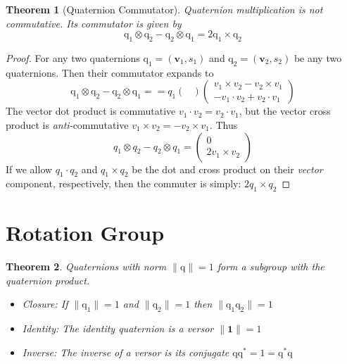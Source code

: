 \documentclass{amsart}
\newtheorem{theorem}{Theorem}[section]
\theoremstyle{definition}
\theoremstyle{remark}
\numberwithin{equation}{section}
\begin{document}
\begin{theorem}[Quaternion Commutator]
  Quaternion multiplication is not commutative. Its commutator is given by
  \begin{equation}
    \mathrm{q}_1\otimes\mathrm{q}_2 - \mathrm{q}_2 \otimes \mathrm{q}_1 = 2 \mathrm{q}_1 \times \mathrm{q}_2 \label{eqn:commutator}
  \end{equation}
\end{theorem}
\begin{proof}
  For any two quaternions $\mathrm{q}_1=(\mathbf{v}_1, s_1)$ and $\mathrm{q}_2=(\mathbf{v}_2, s_2)$ be any two quaternions. Then their commutator expands to
  \begin{equation}
		\mathrm{q}_1 \otimes \mathrm{q}_2 - \mathrm{q}_2 \otimes \mathrm{q}_1 =
    =
		q_1
		\begin{pmatrix}
		\end{pmatrix}
    \begin{pmatrix}
      v_1 \times v_2 - v_2 \times v_1 \\
      -v_1\cdot v_2 +v_2\cdot v_1
    \end{pmatrix}
  \end{equation}
  The vector dot product is commutative $v_1\cdot v_2 = v_2\cdot v_1$, but the vector cross product is \emph{anti-}commutative $v_1\times v_2 = -v_2 \times v_1$. Thus
  \begin{equation}
    q_1\otimes q_2-q_2\otimes q_1 =
    \begin{pmatrix}
      0 \\ 2v_1\times v_2
    \end{pmatrix}
  \end{equation}
  If we allow $q_1\cdot q_2$ and $q_1\times q_2$ be the dot and cross product on their \emph{vector} component, respectively, then the commuter is simply: $2q_1\times q_2$
\end{proof}


\section{Rotation Group}

\begin{theorem}
  Quaternions with norm $\|\mathrm{q}\|=1$ form a subgroup with the quaternion product.
	\begin{itemize}
	\item Closure: If $\|\mathrm{q}_1\|=1$ and $\|\mathrm{q}_2\|=1$ then $\|\mathrm{q}_1\mathrm{q}_2\|=1$
	\item Identity: The identity quaternion is a versor $\|\mathbf{1}\|=1$
	\item Inverse: The inverse of a versor is its conjugate $\mathrm{q}\mathrm{q}^*=1=\mathrm{q}^*\mathrm{q}$
	\end{itemize}
\end{theorem}
\end{document}
